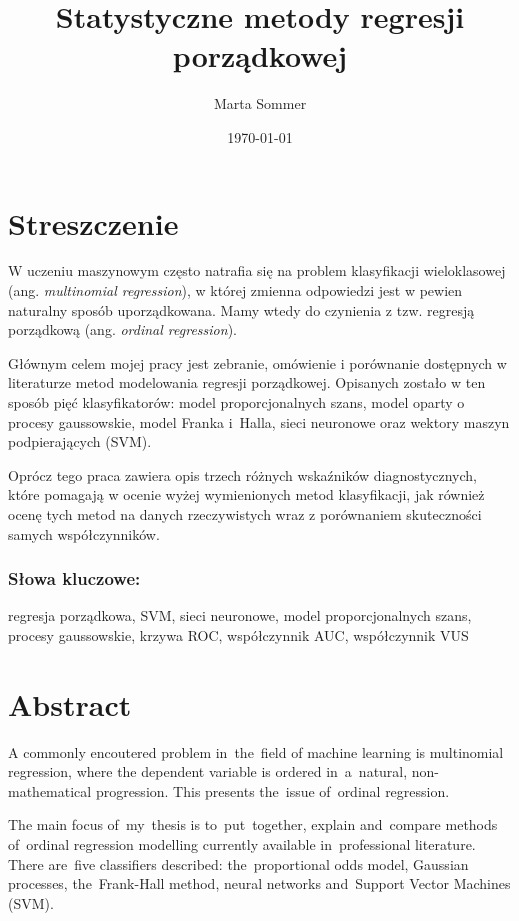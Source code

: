 \documentclass{mini}
\title{Statystyczne metody regresji porządkowej}
\author{Marta Sommer}
\date{\today}
\begin{document}
\maketitle
\tableofcontents

\chapter*{Streszczenie}

W uczeniu maszynowym często natrafia się na problem klasyfikacji wieloklasowej (ang. \textit{multinomial regression}), w której zmienna odpowiedzi jest w pewien naturalny sposób uporządkowana. Mamy wtedy do czynienia z tzw. regresją porządkową (ang. \textit{ordinal regression}). 

Głównym celem mojej pracy jest zebranie, omówienie i porównanie dostępnych w literaturze metod modelowania regresji porządkowej. Opisanych zostało w ten sposób pięć klasyfikatorów: model proporcjonalnych szans, model oparty o procesy gaussowskie, model Franka i~Halla, sieci neuronowe oraz wektory maszyn podpierających (SVM). 

Oprócz tego praca zawiera opis trzech różnych wskaźników diagnostycznych, które pomagają w ocenie wyżej wymienionych metod klasyfikacji, jak również ocenę tych metod na danych rzeczywistych wraz z porównaniem skuteczności samych współczynników.

\subsection*{Słowa kluczowe:}

regresja porządkowa, SVM, sieci neuronowe, model proporcjonalnych szans, procesy gaussowskie, krzywa ROC, współczynnik AUC, współczynnik VUS 

\chapter*{Abstract}

A commonly encoutered problem in~the~field of machine learning is multinomial regression, where the dependent variable is ordered in~a~natural, non-mathematical progression. This presents the~issue of~ordinal regression.

The main focus of~my~thesis is to~put~together, explain and~compare methods of~ordinal regression modelling currently available in~professional literature. There are~five classifiers described: the~proportional odds model, Gaussian processes, the~Frank-Hall method, neural networks and~Support Vector Machines (SVM).
\end{document}
